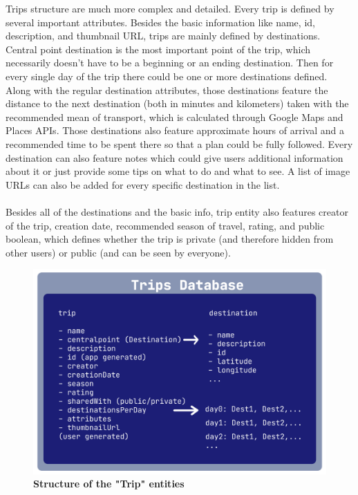 Trips structure are much more complex and detailed. Every trip is defined by several important attributes. Besides the basic information like name, id, description, and thumbnail URL, trips are mainly defined by destinations. Central point destination is the most important point of the trip, which necessarily doesn't have to be a beginning or an ending destination. Then for every single day of the trip there could be one or more destinations defined. Along with the regular destination attributes, those destinations feature the distance to the next destination (both in minutes and kilometers) taken with the recommended mean of transport, which is calculated through Google Maps and Places APIs. Those destinations also feature approximate hours of arrival and a recommended time to be spent there so that a plan could be fully followed. Every destination can also feature notes which could give users additional information about it or just provide some tips on what to do and what to see. A list of image URLs can also be added for every specific destination in the list. \\ \\
Besides all of the destinations and the basic info, trip entity also features creator of the trip, creation date, recommended season of travel, rating, and public boolean, which defines whether the trip is private (and therefore hidden from other users) or public (and can be seen by everyone). \\
\begin{figure}[!htb]
\centering
\includegraphics[width=\textwidth]{../Images/TripsStructurePNG.png}
\caption{\label{fig:dbapiuser}\textbf{Structure of the "Trip" entities}}
\end{figure}
\newpage


